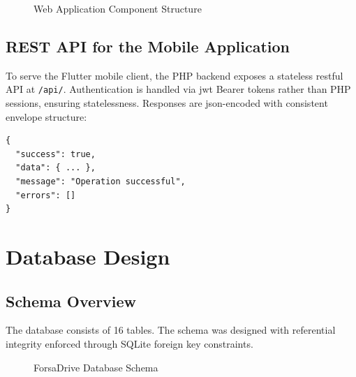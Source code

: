 \documentclass[12pt,a4paper,openright]{report}
\begin{document}
\begin{figure}[H]
\centering
{}
\caption{Web Application Component Structure}
\label{fig:web-components}
\end{figure}

\subsection{REST API for the Mobile Application}

To serve the Flutter mobile client, the PHP backend exposes a stateless \gls{rest}ful API at \texttt{/api/}. Authentication is handled via \gls{jwt} Bearer tokens rather than PHP sessions, ensuring statelessness. Responses are \gls{json}-encoded with consistent envelope structure:

\begin{lstlisting}[style=phpstyle, caption={Standard JSON API Response Envelope}]
{
  "success": true,
  "data": { ... },
  "message": "Operation successful",
  "errors": []
}
\end{lstlisting}

\section{Database Design}

\subsection{Schema Overview}

The database consists of 16 tables. The schema was designed with referential integrity enforced through SQLite foreign key constraints.

\begin{figure}[H]
\centering
{}
\caption{ForsaDrive Database Schema}
\label{fig:db-schema}
\end{figure}
\end{document}
